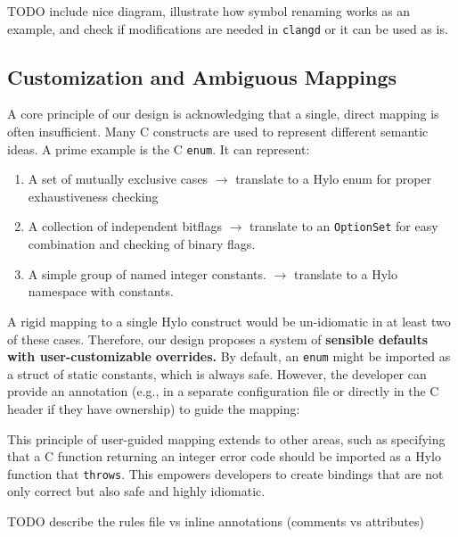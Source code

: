 TODO include nice diagram, illustrate how symbol renaming works as an example, and check if modifications are needed in \texttt{clangd} or it can be used as is.


\subsection{Customization and Ambiguous Mappings}

A core principle of our design is acknowledging that a single, direct mapping is often insufficient. Many C constructs are used to represent different semantic ideas. A prime example is the C \texttt{enum}. It can represent:
\begin{enumerate}
    \item A set of mutually exclusive cases \(\rightarrow\) translate to a Hylo enum for proper exhaustiveness checking
    \item A collection of independent bitflags \(\rightarrow\) translate to an \texttt{OptionSet} \cite{OptionSet} for easy combination and checking of binary flags.
    \item A simple group of named integer constants. \(\rightarrow\) translate to a Hylo namespace with constants.
\end{enumerate}
A rigid mapping to a single Hylo construct would be un-idiomatic in at least two of these cases. Therefore, our design proposes a system of \textbf{sensible defaults with user-customizable overrides.} By default, an \texttt{enum} might be imported as a struct of static constants, which is always safe. However, the developer can provide an annotation (e.g., in a separate configuration file or directly in the C header if they have ownership) to guide the mapping:

This principle of user-guided mapping extends to other areas, such as specifying that a C function returning an integer error code should be imported as a Hylo function that \texttt{throws}. This empowers developers to create bindings that are not only correct but also safe and highly idiomatic.

TODO describe the rules file vs inline annotations (comments vs attributes)